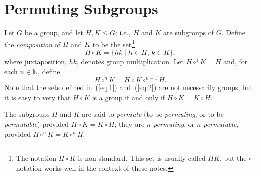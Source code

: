 \documentclass[11pt,reqno]{amsart}
\theoremstyle{plain}
\theoremstyle{definition}
\theoremstyle{remark}
\newcommand{\<}{\ensuremath{\langle}}
\renewcommand{\>}{\ensuremath{\rangle}}
\newcommand{\N}{\ensuremath{\mathbb{N}}}
\renewcommand{\leq}{\ensuremath{\leqslant}}
\newcommand{\circn}{\ensuremath{\circ^{n}}}
\begin{document}
\section{Permuting Subgroups}
Let $G$ be a group, and let $H, K \leq G$; i.e., $H$ and $K$ are subgroups of
$G$.  Define the \emph{composition} of $H$ and $K$ to be the set\footnote{The
  notation $H\circ K$ is non-standard.  This set is usually called $HK$, but the
  $\circ$ notation works well in the context of these notes.}
\begin{equation}
  \label{eq:1}
H\circ K = \{hk \mid h\in H, \, k\in K\},  
\end{equation}
where juxtaposition, $hk$, denotes group multiplication.
Let $H\circ^1 K = H$ and, for each $n\in \N$, define
\begin{equation}
  \label{eq:2}
H\circn K = H\circ K \circ^{n-1} H.  
\end{equation}
Note that the sets defined in~(\ref{eq:1}) and~(\ref{eq:2}) are not necessarily
groups, but it is easy to very that $H\circ K$ is a group if and only if $H
\circ K = K\circ H$. 

The subgroups $H$ and $K$ are said to \emph{permute} (to be \emph{permuting}, or
to be \emph{permutable}) provided $H \circ K= K \circ H$; they
are \emph{$n$-permuting}, or \emph{$n$-permutable}, provided 
$H \circ^{n} K = K \circ^{n} H$.
\end{document}
